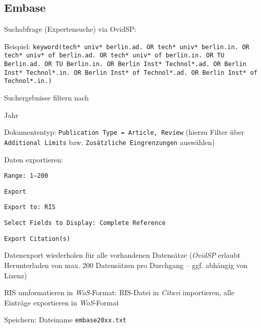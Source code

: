 \subsection*{Embase}
\begin{compactitem}
\item Suchabfrage (Expertensuche) via OvidSP: 
	\begin{compactitem}
	\item Beispiel: \texttt{keyword(tech* univ* berlin.ad. OR tech* univ* berlin.in. OR tech* univ* of berlin.ad. OR tech* univ* of berlin.in. OR \newline TU Berlin.ad. OR TU Berlin.in. OR Berlin Inst* Technol*.ad. OR  \newline Berlin Inst* Technol*.in. OR Berlin Inst* of Technol*.ad. OR  \newline Berlin Inst* of Technol*.in.)}
	\end{compactitem}
\item Suchergebnisse filtern nach
	\begin{compactitem}
    \item Jahr
    \item Dokumententyp: \texttt{Publication Type = Article, Review} (hierzu Filter über \texttt{Additional Limits} bzw. \texttt{Zusätzliche Eingrenzungen} auswählen)
    \end{compactitem}
\item Daten exportieren: 
	\begin{compactitem}
	\item \texttt{Range: 1--200}
    \item \texttt{Export}
    \item \texttt{Export to: RIS}
    \item \texttt{Select Fields to Display: Complete Reference}
    \item \texttt{Export Citation(s)} 
	\end{compactitem}
\item Datenexport wiederholen für alle vorhandenen Datensätze (\textit{OvidSP} erlaubt Herunterladen von max. 200 Datensätzen pro Durchgang -- ggf. abhängig von Lizenz)
\item RIS umformatieren in \textit{WoS}-Format: RIS-Datei in \textit{Citavi} importieren, alle Einträge exportieren in \textit{WoS}-Format
\item Speichern: Dateiname \texttt{embase20xx.txt}
\end{compactitem}

